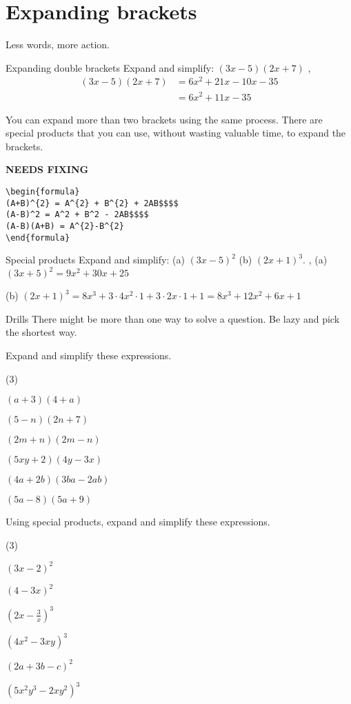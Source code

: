 \documentclass[../../main.tex]{subfiles}
\begin{document}
\section{Expanding brackets}
Less words, more action.

\begin{example}{Expanding double brackets}
Expand and simplify: $(3x-5)(2x+7)$
\sep
\begin{align}
(3x-5)(2x+7) & = 6x^2 + 21x - 10x - 35\\&= 6x^2 + 11x - 35
\end{align}
\end{example}

You can expand more than two brackets using the same process.
There are special products that you can use, without wasting valuable time, to expand the brackets.


{\hfill\Large\bfseries NEEDS FIXING\hfill}
\begin{lstlisting}
\begin{formula}
(A+B)^{2} = A^{2} + B^{2} + 2AB$$$$
(A-B)^2 = A^2 + B^2 - 2AB$$$$
(A-B)(A+B) = A^{2}-B^{2}
\end{formula}
 \end{lstlisting}

\begin{example}{Special products}
Expand and simplify: (a) $(3x-5)^{2}$ \hspace{1cm} (b) $(2x+1)^{3}$.
\sep
(a) $(3x+5)^2=9x^2+30x+25$

(b) $(2x+1)^3=8x^3+3\cdot4x^2\cdot1+3\cdot2x\cdot1+1=8x^3+12x^2+6x+1$
\end{example}

\begin{questions}{Drills}
There might be more than one way to solve a question.
Be lazy and pick the shortest way.

Expand and simplify these expressions.
\begin{question_set}(3)
    \item $(a+3)(4+a)$
    \item $(5-n)(2n+7)$
    \item $(2m+n)(2m-n)$
    \item $(5xy+2)(4y-3x)$
    \item $(4a+2b)(3ba-2ab)$
    \item $(5a-8)(5a+9)$
\end{question_set}

Using special products, expand and simplify these expressions.
\begin{question_set}(3)
    \item $(3x-2)^{2}$
    \item $(4-3x)^{2}$
    \item $\left(2x-\frac {3}{x}\right)^{3}$
    \item $\left(4x^{2}-3xy\right)^{3}$
    \item $(2a+3b-c)^2$
    \item $\left(5x^{2}y^{3}-2xy^{2}\right)^{3}$
\end{question_set}
\end{questions}
\end{document}
